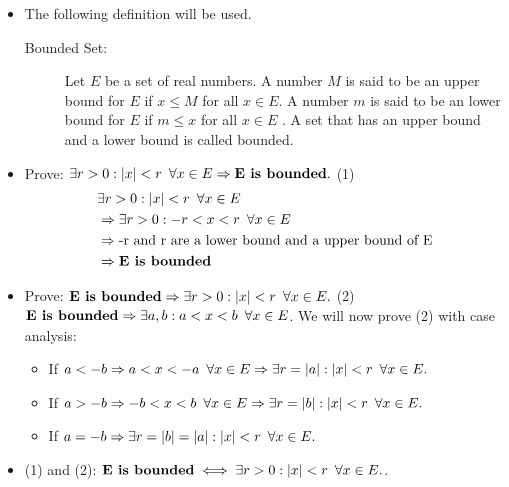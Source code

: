 \begin{numedquestion}
\begin{itemize}
  \item The following definition will be used.     
    \begin{description} 
    \item[Bounded Set:]
      Let \(E\) be a set of real numbers. A number \(M\) is said to be an upper bound for \(E\) if \(x \leq M\) for all \(x \in E .\) A number \(m\) is said to be an lower bound for \(E\) if \(m \leq x\) for all \(x \in E\) . A set that has an upper bound and a lower bound is called bounded.
    \end{description}
  \item  Prove: \(\exists r > 0: |x| < r \hspace{0.5em} \forall x \in E  \Rightarrow \textbf{E is bounded}.\) (1)
        \begin{align*}
            & \exists r > 0: |x| < r \hspace{0.5em} \forall x \in E\\ 
            & \Rightarrow \exists r > 0: -r < x < r \hspace{0.5em} \forall x \in E\\
            & \Rightarrow \text{-r and r are a lower bound and a upper bound of E} \\
            & \Rightarrow \textbf{E is bounded}
        \end{align*}
  
  \item  Prove: \(\textbf{E is bounded} \Rightarrow \exists r > 0: |x| < r \hspace{0.5em} \forall x \in E.\) (2) \newline \newline
         \( \textbf{E is bounded} \Rightarrow \exists a, b: a < x < b \hspace{0.5em} \forall x \in E\). We will now prove (2) with case analysis:
         \begin{itemize}
             \item If \(a < -b \Rightarrow a < x < -a \hspace{0.5em} \forall x \in E \Rightarrow \exists r = |a|: |x| < r \hspace{0.5em} \forall x \in E.\)
             \item If \(a > -b \Rightarrow -b < x < b \hspace{0.5em} \forall x \in E \Rightarrow \exists r = |b|: |x| < r \hspace{0.5em} \forall x \in E.\)
             \item If \(a = -b \Rightarrow \exists r = |b| = |a|: |x| < r \hspace{0.5em} \forall x \in E.\)
         \end{itemize}
         
        
  \item (1) and (2): \(\textbf{E is bounded} \iff \exists r > 0: |x| < r \hspace{0.5em} \forall x \in E.   \). 
\end{itemize}
\end{numedquestion}


